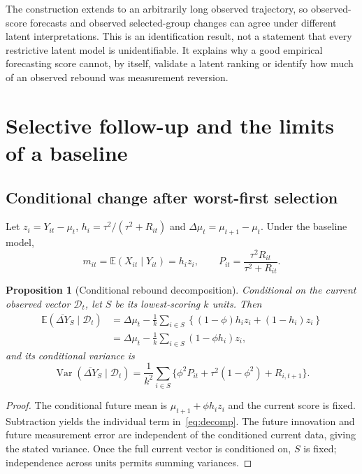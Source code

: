 \documentclass[11pt,letterpaper]{article}
\newtheorem{proposition}{Proposition}
\newcommand{\E}{\mathbb E}
\newcommand{\Var}{\operatorname{Var}}
\begin{document}
The construction extends to an arbitrarily long observed trajectory, so observed-score forecasts and observed selected-group changes can agree under different latent interpretations. This is an identification result, not a statement that every restrictive latent model is unidentifiable. It explains why a good empirical forecasting score cannot, by itself, validate a latent ranking or identify how much of an observed rebound was measurement reversion.

\section{Selective follow-up and the limits of a baseline}
\subsection{Conditional change after worst-first selection}
Let $z_i=Y_{it}-\mu_t$, $h_i=\tau^2/(\tau^2+R_{it})$ and $\Delta\mu_t=\mu_{t+1}-\mu_t$. Under the baseline model,
\begin{equation}
 m_{it}=\E(X_{it}\mid Y_{it})=h_i z_i,\qquad
 P_{it}=\frac{\tau^2R_{it}}{\tau^2+R_{it}}.
 \label{eq:current_posterior}
\end{equation}
\begin{proposition}[Conditional rebound decomposition]\label{prop:rebound}
Conditional on the current observed vector $\mathcal D_t$, let $S$ be its lowest-scoring $k$ units. Then
\begin{align}
 \E(\overline{\Delta Y}_S\mid\mathcal D_t)
 &=\Delta\mu_t-\frac1k\sum_{i\in S}
       \left\{(1-\phi)h_i z_i+(1-h_i)z_i\right\}\label{eq:decomp}\\
 &=\Delta\mu_t-\frac1k\sum_{i\in S}(1-\phi h_i)z_i,\nonumber
\end{align}
and its conditional variance is
\begin{equation}
 \Var(\overline{\Delta Y}_S\mid\mathcal D_t)
 =\frac1{k^2}\sum_{i\in S}
   \{\phi^2P_{it}+\tau^2(1-\phi^2)+R_{i,t+1}\}.
 \label{eq:rebound_variance}
\end{equation}
\end{proposition}
\begin{proof}
The conditional future mean is $\mu_{t+1}+\phi h_i z_i$ and the current score is fixed. Subtraction yields the individual term in~\eqref{eq:decomp}. The future innovation and future measurement error are independent of the conditioned current data, giving the stated variance. Once the full current vector is conditioned on, $S$ is fixed; independence across units permits summing variances.
\end{proof}
\end{document}
